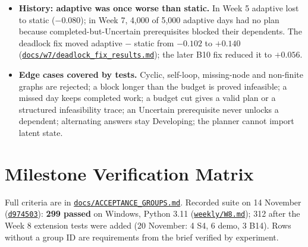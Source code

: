 \documentclass[english]{sintr}
\newcommand{\repourl}{https://github.com/Bhuvan-56/adaptive-learning-path-planner-DAT}
\newcommand{\sha}{cs5903-final-2026}
\DeclareRobustCommand{\rf}[1]{\href{\repourl/blob/\sha/#1}{\nolinkurl{#1}}}
\DeclareRobustCommand{\cm}[1]{\href{\repourl/commit/#1}{\texttt{#1}}}
\begin{document}
\begin{itemize}
    \item \textbf{History: adaptive was once worse than static.} In Week 5 adaptive lost to static ($-0.080$); in Week 7, 4,000 of 5,000 adaptive days had no plan because completed-but-Uncertain prerequisites blocked their dependents. The deadlock fix moved adaptive $-$ static from $-0.102$ to $+0.140$ (\rf{docs/w7/deadlock_fix_results.md}); the later B10 fix reduced it to $+0.056$.
    \item \textbf{Edge cases covered by tests.} Cyclic, self-loop, missing-node and non-finite graphs are rejected; a block longer than the budget is proved infeasible; a missed day keeps completed work; a budget cut gives a valid plan or a structured infeasibility trace; an Uncertain prerequisite never unlocks a dependent; alternating answers stay Developing; the planner cannot import latent state.
\end{itemize}

\section{Milestone Verification Matrix}
Full criteria are in \rf{docs/ACCEPTANCE_GROUPS.md}. Recorded suite on 14 November (\cm{d974503}): \textbf{299 passed} on Windows, Python 3.11 (\rf{weekly/W8.md}); 312 after the Week 8 extension tests were added (20 November: 4 S4, 6 demo, 3 B14). Rows without a group ID are requirements from the brief verified by experiment.
\end{document}
